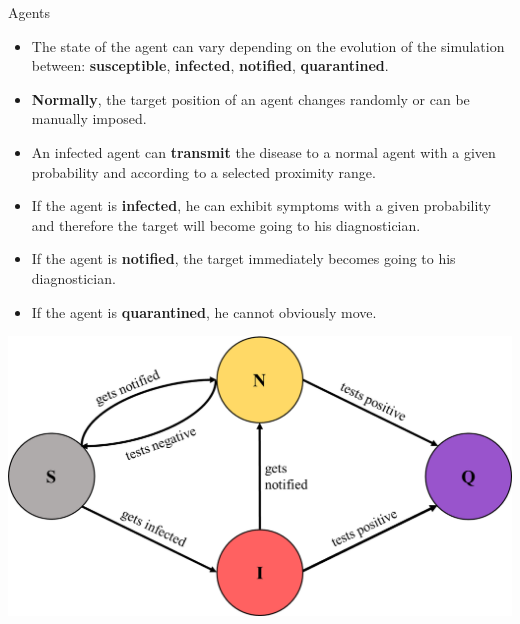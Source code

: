 \begin{block}{Agents}
    \begin{itemize} 
        \item The state of the agent can vary depending on the evolution of the simulation between: \textbf{susceptible}, \textbf{infected}, \textbf{notified}, \textbf{quarantined}.
        \item \textbf{Normally}, the target position of an agent changes randomly or can be manually imposed.
        \item An infected agent can \textbf{transmit} the disease to a normal agent with a given probability and according to a selected proximity range.
        \item If the agent is \textbf{infected}, he can exhibit symptoms with a given probability and therefore the target will become going to his diagnostician.
        \item If the agent is \textbf{notified}, the target immediately becomes going to his diagnostician.
        \item If the agent is \textbf{quarantined}, he cannot obviously move.
    \end{itemize}
\end{block}

\centering
\includegraphics[width=0.4\linewidth]{images/statuses.png}
